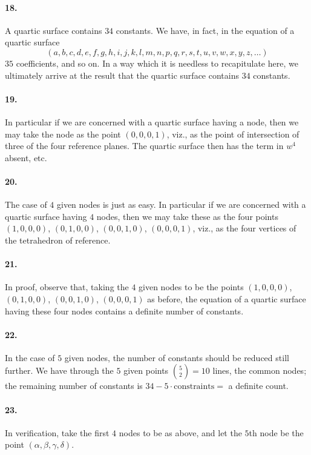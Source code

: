 \documentclass[11pt,a4paper]{article}
\begin{document}
\paragraph{18.}
A quartic surface contains $34$ constants. We have, in fact, in the equation of a quartic
surface
\[
(a, b, c, d, e, f, g, h, i, j, k, l, m, n, p, q, r, s, t, u, v, w, x, y, z, \ldots)
\]
$35$ coefficients, and so on. In a way which it is needless to recapitulate here, we
ultimately arrive at the result that the quartic surface contains $34$ constants.

\paragraph{19.}
In particular if we are concerned with a quartic surface having a node, then we may
take the node as the point $(0, 0, 0, 1)$, viz., as the point of intersection of three
of the four reference planes. The quartic surface then has the term in $w^4$ absent, etc.

\paragraph{20.}
The case of $4$ given nodes is just as easy. In particular if we are concerned with a
quartic surface having $4$ nodes, then we may take these as the four points $(1, 0, 0, 0)$,
$(0, 1, 0, 0)$, $(0, 0, 1, 0)$, $(0, 0, 0, 1)$, viz., as the four vertices of the
tetrahedron of reference.

\paragraph{21.}
In proof, observe that, taking the $4$ given nodes to be the points $(1, 0, 0, 0)$,
$(0, 1, 0, 0)$, $(0, 0, 1, 0)$, $(0, 0, 0, 1)$ as before, the equation of a quartic surface
having these four nodes contains a definite number of constants.

\paragraph{22.}
In the case of $5$ given nodes, the number of constants should be reduced still further.
We have through the $5$ given points $\binom{5}{2} = 10$ lines, the common nodes; the
remaining number of constants is $34 - 5 \cdot \text{constraints} = $ a definite count.

\paragraph{23.}
In verification, take the first $4$ nodes to be as above, and let the $5$th node be the
point $(\alpha, \beta, \gamma, \delta)$.
\end{document}
